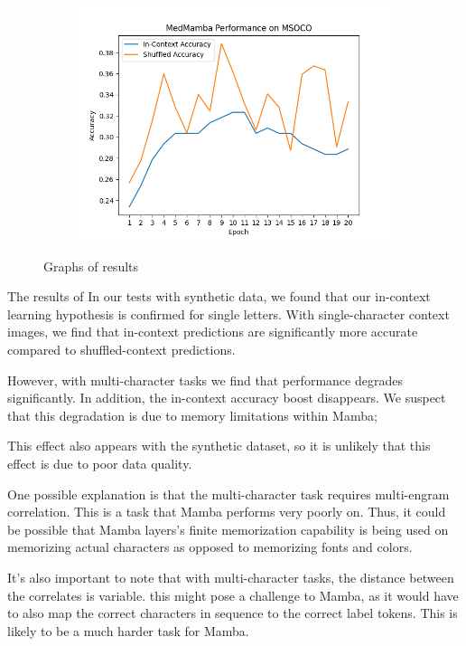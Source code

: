 \begin{figure}[!ht]
\begin{subfigure}{0.5\textwidth}
    \end{subfigure}\begin{subfigure}{0.5\textwidth}
        \includegraphics[width=\textwidth]{figures/medmamba_mscoco.png}
    \end{subfigure}
    \caption{Graphs of results}
    \label{resultslide}
\end{figure}
The results of 
In our tests with synthetic data, we found that our in-context learning
hypothesis is confirmed for single letters. With single-character context
images, we find that in-context predictions are significantly more accurate
compared to shuffled-context predictions.

However, with multi-character tasks we find that performance degrades
significantly. In addition, the in-context accuracy boost disappears.
We suspect that this degradation is due to memory limitations within Mamba;

This effect also appears with the synthetic dataset, so it is unlikely that this
effect is due to poor data quality.

One possible explanation is that the multi-character task requires multi-engram
correlation.
This is a task that Mamba performs very poorly on\cite{mambangram}.
Thus, it could be possible that Mamba layers's finite memorization capability
is being used on memorizing actual characters as opposed to memorizing fonts
and colors.

It's also important to note that with multi-character tasks, the distance
between the correlates is variable.
this might pose a challenge to Mamba, as it would have to also map the correct
characters in sequence to the correct label tokens.
This is likely to be a much harder task for Mamba.

